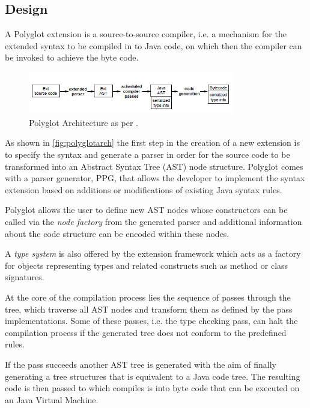 \subsection{Design}
\label{subsec:polyglotarch}
A Polyglot extension is a source-to-source compiler, i.e. a mechanism for the extended syntax to be compiled in to Java code, on which then the  compiler can be invoked to achieve the byte code.

\begin{figure}[htb]
\begin{center}
\includegraphics[width=0.8\textwidth]{polyglotarch.png}
\caption{Polyglot Architecture as per \cite{polyglotpaper}.}
\label{fig:polyglotarch}
\end{center}
\end{figure} 

As shown in \autoref{fig:polyglotarch} the first step in the creation of a new extension is to specify the syntax and generate a parser in order for the source code to be transformed into an Abstract Syntax Tree (AST) node structure. Polyglot comes with a parser generator, PPG, that allows the developer to implement the syntax extension based on additions or modifications of existing Java syntax rules\cite{polyglotpaper}.

Polyglot allows the user to define new AST nodes whose constructors can be called via the \textit{node factory} from the generated parser and additional information about the code structure can be encoded within these nodes. 

A \textit{type system} is also offered by the extension framework which acts as a factory for objects representing types and related constructs such as method or class signatures\cite{polyglotpaper}.

At the core of the compilation process lies the sequence of passes through the tree, which traverse all AST nodes and transform them as defined by the pass implementations. Some of these passes, i.e. the type checking pass, can halt the compilation process if the generated tree does not conform to the predefined rules. 

If the pass succeeds another AST tree is generated with the aim of finally generating a tree structures that is equivalent to a Java code tree. The resulting code is then passed to  which compiles is into byte code that can be executed on an Java Virtual Machine.

